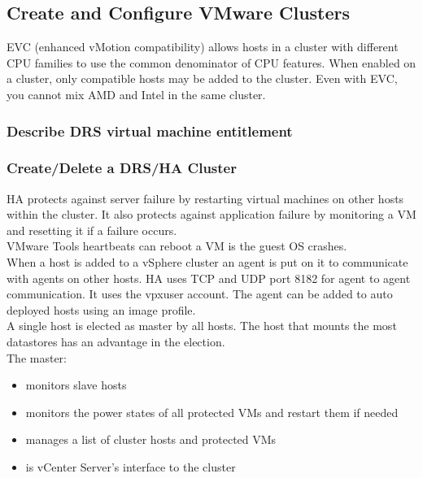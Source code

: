 \subsection{Create and Configure VMware Clusters}

EVC (enhanced vMotion compatibility) allows hosts in a cluster with different
CPU families to use the common denominator of CPU features. When enabled on a
cluster, only compatible hosts may be added to the cluster. Even with EVC,
you cannot mix AMD and Intel in the same cluster.

\subsubsection{Describe DRS virtual machine entitlement}

\subsubsection{Create/Delete a DRS/HA Cluster}

HA protects against server failure by restarting virtual machines on other
hosts within the cluster. It also protects against application failure by
monitoring a VM and resetting it if a failure occurs.\\

VMware Tools heartbeats can reboot a VM is the guest OS crashes.\\

When a host is added to a vSphere cluster an agent is put on it to
communicate with agents on other hosts. HA uses TCP and UDP port 8182 for
agent to agent communication. It uses the vpxuser account. The agent can
be added to auto deployed hosts using an image profile.\\

A single host is elected as master by all hosts. The host that mounts the
most datastores has an advantage in the election.\\

The master:

\begin{itemize}
\item monitors slave hosts
\item monitors the power states of all protected VMs and restart them if needed
\item manages a list of cluster hosts and protected VMs
\item is vCenter Server's interface to the cluster
\end{itemize}

